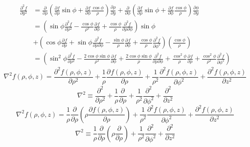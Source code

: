 \begin{equation}
    \begin{split}
        \frac{\partial^{2}{f}}{\partial{y}^{2}} &= \frac{\partial}{\partial{\rho}} \left( \frac{\partial{f}}{\partial{\rho}} \sin{\phi} + \frac{\partial{f}}{\partial{\phi}} \frac{\cos{\phi}}{\rho} \right) \frac{\partial{\rho}}{\partial{y}} + \frac{\partial}{\partial{\phi}} \left( \frac{\partial{f}}{\partial{\rho}} \sin{\phi} + \frac{\partial{f}}{\partial{\phi}} \frac{\cos{\phi}}{\rho} \right) \frac{\partial{\phi}}{\partial{y}} \\
        &= \left( \sin{\phi} \frac{\partial^{2}{f}}{\partial{\rho}^{2}} - \frac{\cos{\phi}}{\rho^{2}} \frac{\partial^{}{f}}{\partial{\phi}^{}} + \frac{\cos{\phi}}{\rho} \frac{\partial^{2}{f}}{\partial{\rho}\partial{\phi}} \right) \sin{\phi} \\
        &+ \left( \cos{\phi} \frac{\partial^{}{f}}{\partial{\rho}^{}} + \sin{\phi} \frac{\partial^{2}{f}}{\partial{\rho}\partial{\phi}} - \frac{\sin{\phi}}{\rho} \frac{\partial^{}{f}}{\partial{\phi}^{}} + \frac{\cos{\phi}}{\rho} \frac{\partial^{2}{f}}{\partial{\phi}^{2}} \right) \left( \frac{\cos{\phi}}{\rho} \right) \\
        &= \left( \sin^{2}{\phi} \frac{\partial^{2}{f}}{\partial{\rho}^{2}} - \frac{2 \cos{\phi} \sin{\phi}}{\rho^{2}} \frac{\partial^{}{f}}{\partial{\phi}^{}} + \frac{2 \cos{\phi} \sin{\phi}}{\rho} \frac{\partial^{2}{f}}{\partial{\rho}\partial{\phi}} + \frac{\cos^{2}{\phi}}{\rho} \frac{\partial^{}{f}}{\partial{\rho}^{}} + \frac{\cos^{2}{\phi}}{\rho^{2}} \frac{\partial^{2}{f}}{\partial{\phi}^{2}} \right)
    \end{split}
\end{equation}
\begin{equation}
    \nabla^{2} f(\rho,\phi,z) = \frac{\partial^{2}{f(\rho,\phi,z)}}{\partial{\rho}^{2}} + \frac{1}{\rho} \frac{\partial^{}{f(\rho,\phi,z)}}{\partial{\rho}^{}} + \frac{1}{\rho^{2}} \frac{\partial^{2}{f(\rho,\phi,z)}}{\partial{\phi}^{2}} + \frac{\partial^{2}{f(\rho,\phi,z)}}{\partial{z}^{2}}
\end{equation}
\begin{equation}
    \nabla^{2} \equiv \frac{\partial^{2}{}}{\partial{\rho}^{2}} + \frac{1}{\rho} \frac{\partial^{}}{\partial{\rho}^{}} + \frac{1}{\rho^{2}} \frac{\partial^{2}{}}{\partial{\phi}^{2}} + \frac{\partial^{2}{}}{\partial{z}^{2}}
\end{equation}
\begin{equation}
    \nabla^{2} f(\rho,\phi,z) = {\frac {1}{\rho }}{\frac {\partial }{\partial \rho }} \left(\rho {\frac {\partial f(\rho,\phi,z)}{\partial \rho }} \right) + \frac{1}{\rho^{2}} \frac{\partial^{2}{f(\rho,\phi,z)}}{\partial{\phi}^{2}} + \frac{\partial^{2}{f(\rho,\phi,z)}}{\partial{z}^{2}}
\end{equation}
\begin{equation}
    \nabla^{2} \equiv {\frac {1}{\rho }}{\frac {\partial }{\partial \rho }} \left(\rho {\frac {\partial }{\partial \rho }} \right) + \frac{1}{\rho^{2}} \frac{\partial^{2}{}}{\partial{\phi}^{2}} + \frac{\partial^{2}{}}{\partial{z}^{2}}
\end{equation}
